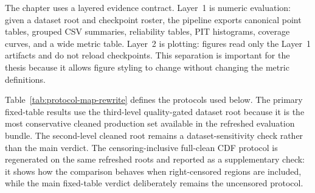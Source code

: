 The chapter uses a layered evidence contract. Layer~1 is numeric evaluation:
given a dataset root and checkpoint roster, the pipeline exports canonical
point tables, grouped CSV summaries, reliability tables, PIT histograms,
coverage curves, and a wide metric table. Layer~2 is plotting: figures read
only the Layer~1 artifacts and do not reload checkpoints. This separation is
important for the thesis because it allows figure styling to change without
changing the metric definitions.

Table~\ref{tab:protocol-map-rewrite} defines the protocols used below. The
primary fixed-table results use the third-level quality-gated dataset root
because it is the most conservative cleaned production set available in the
refreshed evaluation bundle. The second-level cleaned root remains a
dataset-sensitivity check rather than the main verdict. The censoring-inclusive
full-clean CDF protocol is regenerated on the same refreshed roots and reported
as a supplementary check: it shows how the comparison behaves when
right-censored regions are included, while the main fixed-table verdict
deliberately remains the uncensored protocol.

